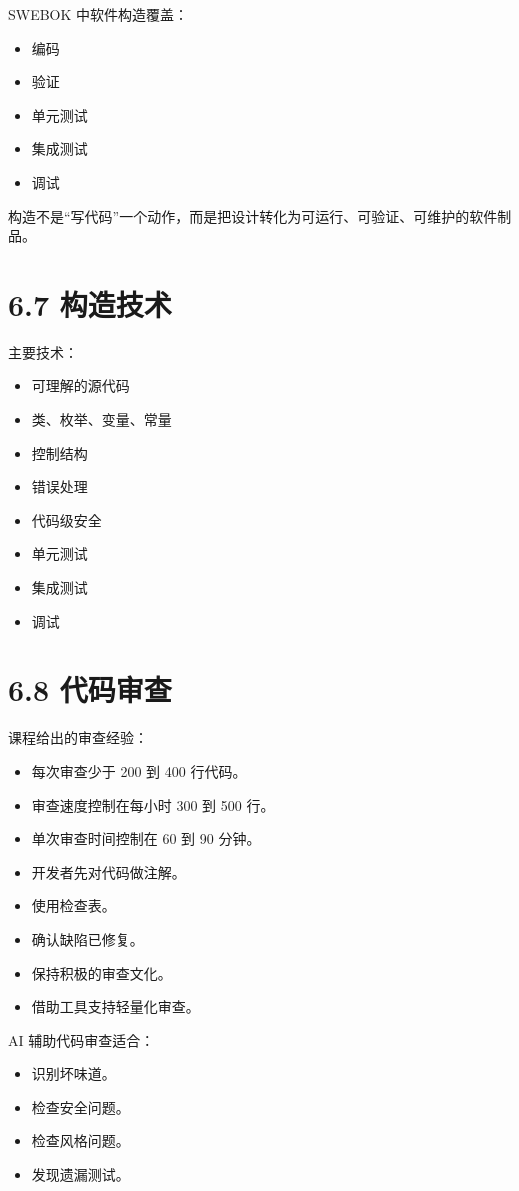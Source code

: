 \documentclass[UTF8,zihao=-4]{ctexart}
\begin{document}
SWEBOK 中软件构造覆盖：

\begin{itemize}
\item 编码
\item 验证
\item 单元测试
\item 集成测试
\item 调试
\end{itemize}

构造不是“写代码”一个动作，而是把设计转化为可运行、可验证、可维护的软件制品。

\section{6.7 构造技术}

主要技术：

\begin{itemize}
\item 可理解的源代码
\item 类、枚举、变量、常量
\item 控制结构
\item 错误处理
\item 代码级安全
\item 单元测试
\item 集成测试
\item 调试
\end{itemize}

\section{6.8 代码审查}

课程给出的审查经验：

\begin{itemize}
\item 每次审查少于 200 到 400 行代码。
\item 审查速度控制在每小时 300 到 500 行。
\item 单次审查时间控制在 60 到 90 分钟。
\item 开发者先对代码做注解。
\item 使用检查表。
\item 确认缺陷已修复。
\item 保持积极的审查文化。
\item 借助工具支持轻量化审查。
\end{itemize}

AI 辅助代码审查适合：

\begin{itemize}
\item 识别坏味道。
\item 检查安全问题。
\item 检查风格问题。
\item 发现遗漏测试。
\end{itemize}
\end{document}
